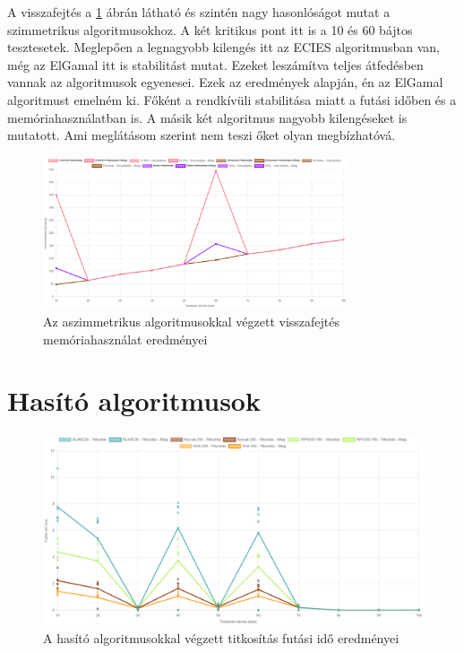 \documentclass[12pt]{report} %
\begin{document}
A visszafejtés a \ref{fig:AsymmetricDecryptionMemoryUsage} ábrán látható és szintén nagy hasonlóságot mutat a szimmetrikus algoritmusokhoz. A két kritikus pont itt is a 10 és 60 bájtos tesztesetek. Meglepően a legnagyobb kilengés itt az ECIES algoritmusban van, még az ElGamal itt is stabilitást mutat. Ezeket leszámítva teljes átfedésben vannak az algoritmusok egyenesei. Ezek az eredmények alapján, én az ElGamal algoritmust emelném ki. Főként a rendkívüli stabilitása miatt a futási időben és a memóriahasználatban is. A másik két algoritmus nagyobb kilengéseket is mutatott. Ami meglátásom szerint nem teszi őket olyan megbízhatóvá.

\begin{figure}[H]
    \centering %
    \includegraphics[width=0.8\textwidth]{Figures/AsymmetricDecryptionMemoryUsage.png} %
    \caption{Az aszimmetrikus algoritmusokkal végzett visszafejtés memóriahasználat eredményei} %
    \label{fig:AsymmetricDecryptionMemoryUsage} %
\end{figure}

\section{Hasító algoritmusok} %

\begin{figure}[H]
    \centering %
    \includegraphics[width=\textwidth]{Figures/HashingEncryptionRunTime.png} %
    \caption{A hasító algoritmusokkal végzett titkosítás futási idő eredményei} %
    \label{fig:HashingEncryptionRunTime} %
\end{figure}
\end{document}
